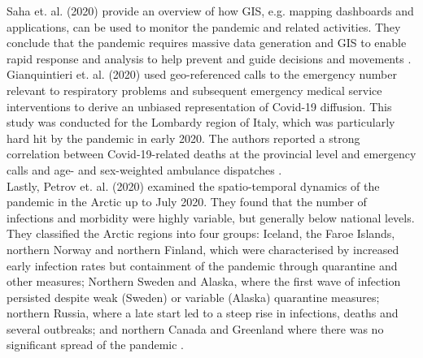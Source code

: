 Saha et. al. (2020) provide an overview of how GIS, e.g. mapping dashboards and applications, can be used to monitor the pandemic and related activities. They conclude that the pandemic requires massive data generation and GIS to enable rapid response and analysis to help prevent and guide decisions and movements \autocite[][]{saha2020monitoring}. \\
Gianquintieri et. al. (2020) used geo-referenced calls to the emergency number relevant to respiratory problems and subsequent emergency medical service interventions to derive an unbiased representation of Covid-19 diffusion. This study was conducted for the Lombardy region of Italy, which was particularly hard hit by the pandemic in early 2020. The authors reported a strong correlation between Covid-19-related deaths at the provincial level and emergency calls and age- and sex-weighted ambulance dispatches \autocite[][]{gianquintieri2020mapping}. \\
Lastly, Petrov et. al. (2020) examined the spatio-temporal dynamics of the pandemic in the Arctic up to July 2020. They found that the number of infections and morbidity were highly variable, but generally below national levels. They classified the Arctic regions into four groups: Iceland, the Faroe Islands, northern Norway and northern Finland, which were characterised by increased early infection rates but containment of the pandemic through quarantine and other measures; Northern Sweden and Alaska, where the first wave of infection persisted despite weak (Sweden) or variable (Alaska) quarantine measures; northern Russia, where a late start led to a steep rise in infections, deaths and several outbreaks; and northern Canada and Greenland where there was no significant spread of the pandemic \autocite[][]{petrov2020spatiotemporal}.

